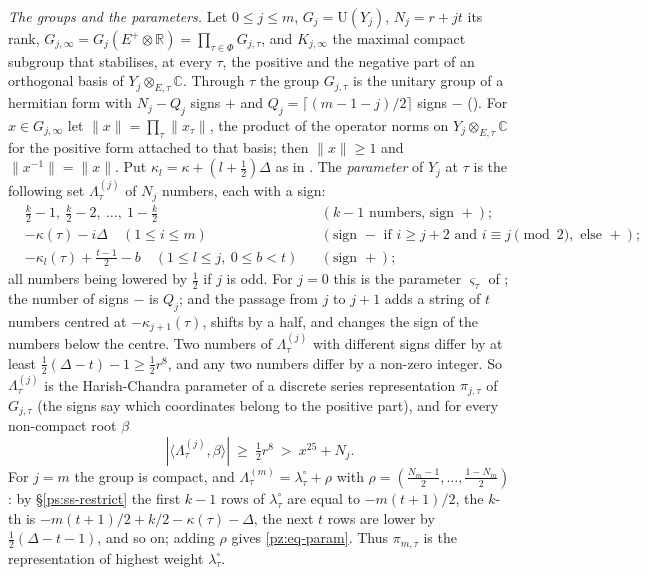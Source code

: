 \documentclass[10pt]{amsart}
\theoremstyle{definition}
\theoremstyle{remark}
\newcommand{\C}{\mathbb C}
\newcommand{\R}{\mathbb R}
\providecommand{\auPl}{\Phi}
\providecommand{\auU}{\mathrm U}
\begin{document}
\emph{The groups and the parameters.} Let $0\le j\le m$, $G_j=\auU(Y_j)$, $N_j=r+jt$ its rank,
$G_{j,\infty}=G_j(E^+\otimes\R)=\prod_{\tau\in\auPl}G_{j,\tau}$, and $K_{j,\infty}$ the maximal compact
subgroup that stabilises, at every $\tau$, the positive and the negative part of an orthogonal
basis of $Y_j\otimes_{E,\tau}\C$. Through $\tau$ the group $G_{j,\tau}$ is the unitary group of a
hermitian form with $N_j-Q_j$ signs $+$ and $Q_j=\lceil(m-1-j)/2\rceil$ signs $-$
({\cite[\S14.3]{P46}}). For $x\in G_{j,\infty}$ let $\|x\|=\prod_\tau\|x_\tau\|$, the product of the
operator norms on $Y_j\otimes_{E,\tau}\C$ for the positive form attached to that basis; then
$\|x\|\ge1$ and $\|x^{-1}\|=\|x\|$. Put $\kappa_l=\kappa+(l+\tfrac12)\Delta$ as in
{\cite[\S14.1]{P46}}. The \emph{parameter} of $Y_j$ at $\tau$ is the following set
$\Lambda^{(j)}_\tau$ of $N_j$ numbers, each with a sign:
\begin{equation}\label{pz:eq-param}
\begin{aligned}
&\tfrac k2-1,\ \tfrac k2-2,\ \dots,\ 1-\tfrac k2&&(k-1\text{ numbers, sign }+);\\
&-\kappa(\tau)-i\Delta\quad(1\le i\le m)&&(\text{sign }-\text{ if }i\ge j+2\text{ and }i\equiv j\!\!\pmod 2,\text{ else }+);\\
&-\kappa_l(\tau)+\tfrac{t-1}2-b\quad(1\le l\le j,\ 0\le b<t)&&(\text{sign }+);
\end{aligned}
\end{equation}
all numbers being lowered by $\tfrac12$ if $j$ is odd. For $j=0$ this is the parameter
$\varsigma_\tau$ of {\cite[\S14.3]{P46}}; the number of signs $-$ is $Q_j$; and the passage from
$j$ to $j+1$ adds a string of $t$ numbers centred at $-\kappa_{j+1}(\tau)$, shifts by a half, and
changes the sign of the numbers below the centre. Two numbers of $\Lambda^{(j)}_\tau$ with
different signs differ by at least $\tfrac12(\Delta-t)-1\ge\tfrac12r^8$, and any two numbers
differ by a non-zero integer. So $\Lambda^{(j)}_\tau$ is the Harish-Chandra parameter of a discrete
series representation $\pi_{j,\tau}$ of $G_{j,\tau}$ (the signs say which coordinates belong to the
positive part), and for every non-compact root $\beta$
\begin{equation}\label{pz:eq-gap}
|\langle\Lambda^{(j)}_\tau,\beta\rangle|\ \ge\ \tfrac12r^8\ >\ x^{25}+N_j .
\end{equation}
For $j=m$ the group is compact, and $\Lambda^{(m)}_\tau=\lambda^\circ_\tau+\rho$ with $\rho=
(\tfrac{N_m-1}2,\dots,\tfrac{1-N_m}2)$: by \S\ref{ps:ss-restrict} the first $k-1$ rows of
$\lambda^\circ_\tau$ are equal to $-m(t+1)/2$, the $k$-th is $-m(t+1)/2+k/2-\kappa(\tau)-\Delta$,
the next $t$ rows are lower by $\tfrac12(\Delta-t-1)$, and so on; adding $\rho$ gives
\eqref{pz:eq-param}. Thus $\pi_{m,\tau}$ is the representation of highest weight $\lambda^\circ_\tau$.
\end{document}
